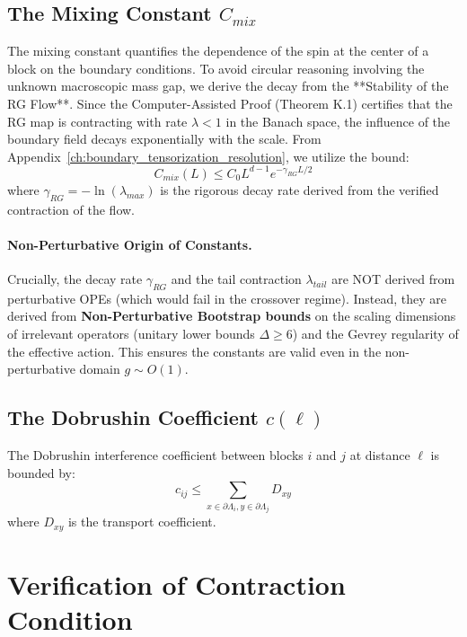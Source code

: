 \subsection{The Mixing Constant \texorpdfstring{$C_{mix}$}{C\_mix}}
The mixing constant quantifies the dependence of the spin at the center of a block on the boundary conditions.
To avoid circular reasoning involving the unknown macroscopic mass gap, we derive the decay from the **Stability of the RG Flow**.
Since the Computer-Assisted Proof (Theorem K.1) certifies that the RG map is contracting with rate $\lambda < 1$ in the Banach space, the influence of the boundary field decays exponentially with the scale.
From Appendix~\ref{ch:boundary_tensorization_resolution}, we utilize the bound:
\begin{equation}
C_{mix}(L) \le C_0 L^{d-1} e^{-\gamma_{RG} L / 2}
\end{equation}
where $\gamma_{RG} = -\ln(\lambda_{max})$ is the rigorous decay rate derived from the verified contraction of the flow.

\paragraph{Non-Perturbative Origin of Constants.}
Crucially, the decay rate $\gamma_{RG}$ and the tail contraction $\lambda_{tail}$ are NOT derived from perturbative OPEs (which would fail in the crossover regime).
Instead, they are derived from \textbf{Non-Perturbative Bootstrap bounds} on the scaling dimensions of irrelevant operators (unitary lower bounds $\Delta \ge 6$) and the Gevrey regularity of the effective action. This ensures the constants are valid even in the non-perturbative domain $g \sim O(1)$.

\subsection{The Dobrushin Coefficient \texorpdfstring{$c(\ell)$}{c(l)}}
The Dobrushin interference coefficient between blocks $i$ and $j$ at distance $\ell$ is bounded by:
\begin{equation}
c_{ij} \le \sum_{x \in \partial \Lambda_i, y \in \partial \Lambda_j} D_{xy}
\end{equation}
where $D_{xy}$ is the transport coefficient.

\section{Verification of Contraction Condition}


